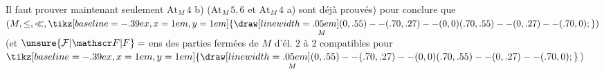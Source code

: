  Il faut prouver maintenant seulement $\mathrm{At}_M\,4$  b) ($\mathrm{At}_M\,5,6$ et $\mathrm{At}_M\,4$ a) sont déjà prouvés) pour conclure que $(M,\leq,\ll,\underset{M}{\mathrel{\tikz[baseline=-.39ex,x=1em,y=1em]{\draw[line width=.05em] (0,.55)--(.70,.27)--(0,0) (.70,.55)--(0,.27)--(.70,0);}}})$ (et  $\unsure{\mathcal F|\mathscr F|F}={}$ens des parties fermées de $M$  d'él. $2$ à $2$ compatibles pour $\underset{M}{\mathrel{\tikz[baseline=-.39ex,x=1em,y=1em]{\draw[line width=.05em] (0,.55)--(.70,.27)--(0,0) (.70,.55)--(0,.27)--(.70,0);}}}$)
